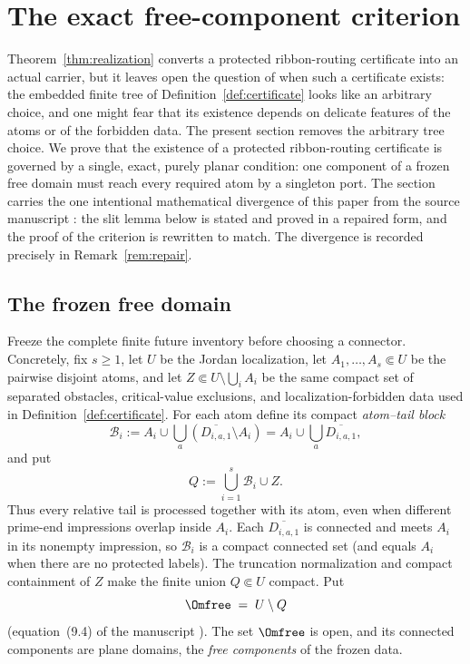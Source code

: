 
\section{The exact free-component criterion}\label{sec:criterion}

Theorem~\ref{thm:realization} converts a protected ribbon-routing certificate into an
actual carrier, but it leaves open the question of when such a certificate exists: the
embedded finite tree of Definition~\ref{def:certificate} looks like an arbitrary choice,
and one might fear that its existence depends on delicate features of the atoms or of the
forbidden data. The present section removes the arbitrary tree choice. We prove that the
existence of a protected ribbon-routing certificate is governed by a single, exact,
purely planar condition: one component of a frozen free domain must reach every required
atom by a singleton port. The section carries the one intentional mathematical divergence
of this paper from the source manuscript \cite{MWman}: the slit lemma below is stated and
proved in a repaired form, and the proof of the criterion is rewritten to match. The
divergence is recorded precisely in Remark~\ref{rem:repair}.

\subsection{The frozen free domain}\label{subsec:D-frozen}

Freeze the complete finite future inventory before choosing a connector.
Concretely, fix $s\ge1$, let $U$ be the Jordan localization, let
$A_1,\dots,A_s\Subset U$ be the pairwise disjoint atoms, and let
$Z\Subset U\setminus\bigcup_iA_i$ be the same compact set of separated
obstacles, critical-value exclusions, and localization-forbidden data used
in Definition~\ref{def:certificate}.  For each atom define its compact
\emph{atom--tail block}
\[
\mathcal B_i:=
A_i\cup\bigcup_a(\overline{D_{i,a,1}}\setminus A_i)
=A_i\cup\bigcup_a\overline{D_{i,a,1}},
\]
and put
\[
Q:=\bigcup_{i=1}^{s}\mathcal B_i\cup Z.
\]
Thus every relative tail is processed together with its atom, even when
different prime-end impressions overlap inside $A_i$.  Each
$\overline{D_{i,a,1}}$ is connected and meets $A_i$ in its nonempty
impression, so $\mathcal B_i$ is a compact connected set (and equals $A_i$ when
there are no protected labels).  The truncation normalization and compact
containment of $Z$ make the finite union $Q\Subset U$ compact.  Put
\begin{equation}\label{eq:D-free-domain}
\Omfree \;=\; U\setminus Q
\end{equation}
(equation~(9.4) of the manuscript \cite{MWman}). The set $\Omfree$ is open, and its
connected components are plane domains, the \emph{free components} of the frozen data.

